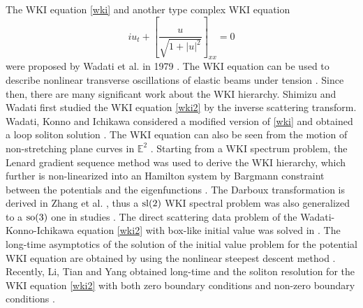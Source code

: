 \documentclass[11pt]{article}
\numberwithin{equation}{section}
\begin{document}
The WKI equation \eqref{wki} and another  type complex  WKI equation
\begin{equation}
   i u_t+\left[\frac{u}{\sqrt{1+|u|^2}}\right]_{xx}=0\label{wki2}
\end{equation}
were  proposed by Wadati et al. in 1979 \cite{wki-1,wki-2}. The WKI equation can be used to describe nonlinear transverse oscillations of elastic beams under tension \cite{ichikawa-1981}.  Since then, there are many significant work about the WKI hierarchy.  Shimizu and Wadati first studied the WKI equation \eqref{wki2} by the inverse scattering transform.   Wadati, Konno  and Ichikawa considered a modified  version of
\eqref{wki} and obtained a loop soliton solution \cite{KIW-1981}.   The WKI equation can also be seen from the motion of non-stretching plane curves in $\mathbb{E}^2$ \cite{chou-2002,qu-2005}. Starting from a WKI spectrum problem, the  Lenard  gradient sequence method was used to derive  the WKI hierarchy, which further is non-linearized into an Hamilton system by Bargmann constraint between the
potentials and the eigenfunctions \cite{qiao-1993,qiao-1995}. The Darboux transformation is derived in Zhang et al. \cite{zhang-2017}, thus a $\textup{sl}(2)$ WKI spectral problem was also generalized to a $\textup{so}(3)$ one in studies \cite{ma-2014,ma-2020-1,ma-2020-2}. The direct scattering data problem of the Wadati-Konno-Ichikawa equation  \eqref{wki2} with box-like initial value was solved in \cite{tu-2021}. The long-time asymptotics of the solution of the initial value problem for the potential WKI  equation are obtained by using the nonlinear steepest descent method \cite{CGW}.  Recently, Li,  Tian and Yang  obtained long-time and  the soliton resolution for the WKI equation \eqref{wki2} with both zero boundary conditions and non-zero boundary conditions  \cite{LTY-2022,li-2022}.
\end{document}
